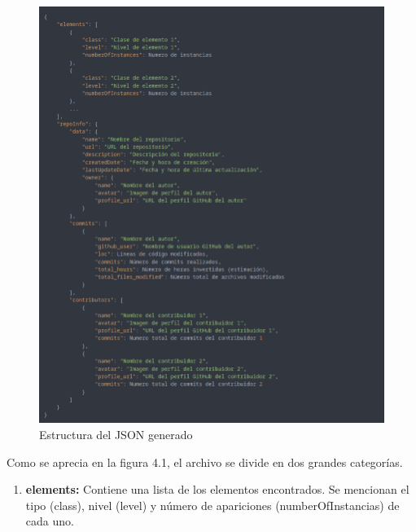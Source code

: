 \documentclass[a4paper, 12pt]{book}
\begin{document}
\begin{itemize}
    \begin{figure} [H]
        \centering
        \includegraphics[width=\linewidth]{img/example_results_json.png}
        \caption{Estructura del JSON generado}
        \label{fig:enter-label}
    \end{figure}

    Como se aprecia en la figura 4.1, el archivo se divide en dos grandes categorías.

    \begin{enumerate}
        \item \textbf{elements: } Contiene una lista de los elementos encontrados. Se mencionan el tipo (class), nivel (level) y número de apariciones (numberOfInstancias) de cada uno.


\end{enumerate}
\end{itemize}
\end{document}
